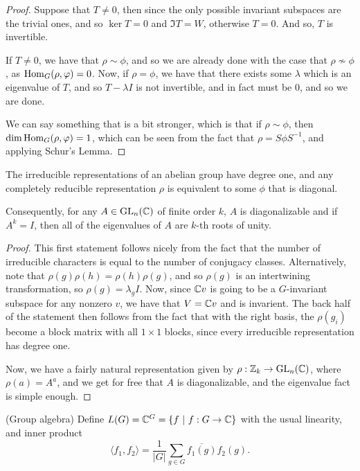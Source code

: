 \documentclass{article}
\begin{document}
\begin{proof}

Suppose that $T \neq 0$, then since the only possible invariant subspaces are the trivial ones, and so $\ker T = 0$ and $\Im T = W$, otherwise $T = 0$. And so, $T$ is invertible.

If $T \neq 0$, we have that $\rho \sim \phi$, and so we are already done with the case that $\rho \not\sim \phi$, as $\operatorname{Hom}_G(\rho,\varphi) = 0$. Now, if $\rho = \phi$, we have that there exists some $\lambda$ which is an eigenvalue of $T$, and so $T-\lambda I $ is not invertible, and in fact must be $0$, and so we are done. 

We can say something that is a bit stronger, which is that if $\rho \sim \phi$, then $\dim \operatorname{Hom}_G(\rho, \varphi) = 1$, which can be seen from the fact that $\rho = S \phi S^{-1}$, and applying Schur's Lemma.
\end{proof}

\begin{corollary}
The irreducible representations of an abelian group have degree one, and any completely reducible representation $\rho$ is equivalent to some $\phi$ that is diagonal.

Consequently, for any $A \in \operatorname{GL}_n(\mathbb C)$ of finite order $k$, $A$ is diagonalizable and if $A^k = I$, then all of the eigenvalues of $A$ are $k$-th roots of unity.
\end{corollary}
\begin{proof}
This first statement follows nicely from the fact that the number of irreducible characters is equal to the number of conjugacy classes. Alternatively, note that $\rho(g)\rho(h) = \rho(h)\rho(g)$, and so $\rho(g)$ is an intertwining transformation, so $\rho(g) = \lambda_g I$. Now, since $\mathbb C v$ is going to be a $G$-invariant subspace for any nonzero $v$, we have that $V = \mathbb C v$ and is invarient. The back half of the statement then follows from the fact that with the right basis, the $\rho(g_i)$ become a block matrix with all $1 \times 1$ blocks, since every irreducible representation has degree one.

Now, we have a fairly natural representation given by $\rho : \mathbb Z_k \to \operatorname{GL}_n(\mathbb C)$, where $\rho(a) = A^a$, and we get for free that $A$ is diagonalizable, and the eigenvalue fact is simple enough.
\end{proof}

\begin{definition}
(Group algebra) Define $L(G) = \mathbb C^G = \{ f \ | \ f : G \to \mathbb C \}$ with the usual linearity, and inner product $$\langle f_1, f_2 \rangle = \frac{1}{|G|} \sum_{g \in G} \overline{f_1(g)}f_2(g).$$
\end{definition}
\end{document}
